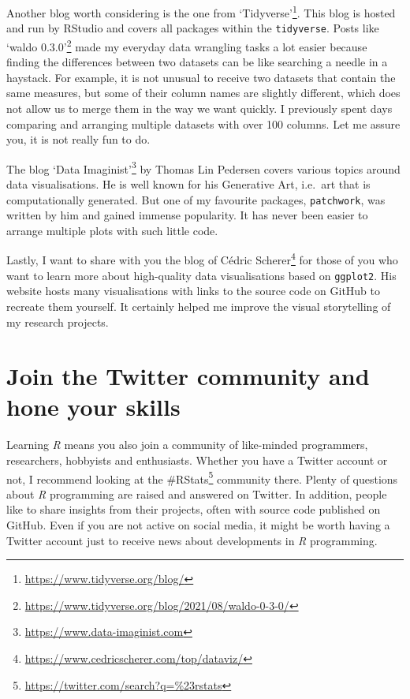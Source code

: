 \documentclass[
  letterpaper,
]{krantz}
\renewcommand{\href}[2]{#2\footnote{\url{#1}}}
\begin{document}
Another blog worth considering is the one from
\href{https://www.tidyverse.org/blog/}{`Tidyverse'}. This blog is hosted
and run by RStudio and covers all packages within the
\texttt{tidyverse}. Posts like
\href{https://www.tidyverse.org/blog/2021/08/waldo-0-3-0/}{`waldo
0.3.0'} made my everyday data wrangling tasks a lot easier because
finding the differences between two datasets can be like searching a
needle in a haystack. For example, it is not unusual to receive two
datasets that contain the same measures, but some of their column names
are slightly different, which does not allow us to merge them in the way
we want quickly. I previously spent days comparing and arranging
multiple datasets with over 100 columns. Let me assure you, it is not
really fun to do.

The blog \href{https://www.data-imaginist.com}{`Data Imaginist'} by
Thomas Lin Pedersen covers various topics around data visualisations. He
is well known for his Generative Art, i.e.~art that is computationally
generated. But one of my favourite packages, \texttt{patchwork}, was
written by him and gained immense popularity. It has never been easier
to arrange multiple plots with such little code.

Lastly, I want to share with you the
\href{https://www.cedricscherer.com/top/dataviz/}{blog of Cédric
Scherer} for those of you who want to learn more about high-quality data
visualisations based on \texttt{ggplot2}. His website hosts many
visualisations with links to the source code on GitHub to recreate them
yourself. It certainly helped me improve the visual storytelling of my
research projects.

\section{Join the Twitter community and hone your
skills}\label{sec-next-steps-twitter}

Learning \emph{R} means you also join a community of like-minded
programmers, researchers, hobbyists and enthusiasts. Whether you have a
Twitter account or not, I recommend looking at the
\href{https://twitter.com/search?q=\%23rstats}{\#RStats} community
there. Plenty of questions about \emph{R} programming are raised and
answered on Twitter. In addition, people like to share insights from
their projects, often with source code published on GitHub. Even if you
are not active on social media, it might be worth having a Twitter
account just to receive news about developments in \emph{R} programming.
\end{document}
